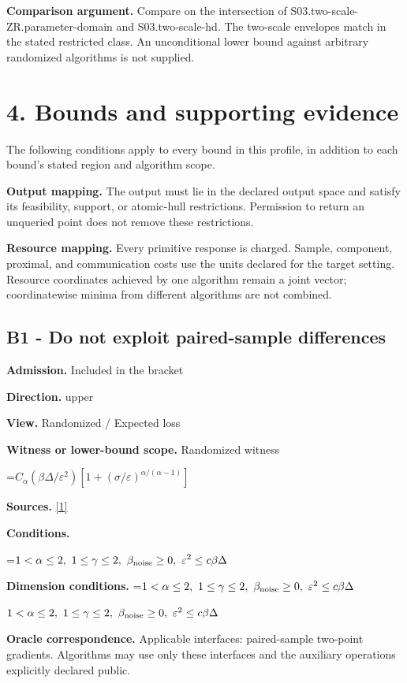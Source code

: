 \documentclass[10pt,a4paper]{article}
\newcommand{\AtlasMath}[1]{\par\begingroup\centering\setbox0=\hbox{$\displaystyle #1$}\ifdim\wd0>1.4\linewidth\typeout{ATLAS WIDE FORMULA: \the\wd0}\fi\ifdim\wd0>\linewidth\resizebox{\linewidth}{!}{\box0}\else\box0\fi\par\endgroup}
\newcommand{\AtlasInlineMath}[1]{\begingroup\setbox0=\hbox{$#1$}\ifdim\wd0>.4\linewidth\endgroup\AtlasMath{#1}\else\endgroup$#1$\fi}
\begin{document}
\textbf{Comparison argument.} Compare on the intersection of S03.two-scale-ZR.parameter-domain and S03.two-scale-hd. The two-scale envelopes match in the stated restricted class. An unconditional lower bound against arbitrary randomized algorithms is not supplied.

\section{4. Bounds and supporting evidence}
The following conditions apply to every bound in this profile, in addition to each bound's stated region and algorithm scope.

\textbf{Output mapping.} The output must lie in the declared output space and satisfy its feasibility, support, or atomic-hull restrictions. Permission to return an unqueried point does not remove these restrictions.

\textbf{Resource mapping.} Every primitive response is charged. Sample, component, proximal, and communication costs use the units declared for the target setting. Resource coordinates achieved by one algorithm remain a joint vector; coordinatewise minima from different algorithms are not combined.

\subsection{B1 - Do not exploit paired-sample differences}
\textbf{Admission.} Included in the bracket

\textbf{Direction.} upper

\textbf{View.} Randomized / Expected loss

\textbf{Witness or lower-bound scope.} Randomized witness

\AtlasMath{C_\alpha (\beta\Delta/\varepsilon^2)[1+(\sigma/\varepsilon)^{\alpha/(\alpha-1)}]}
\textbf{Sources.} \href{https://arxiv.org/pdf/2512.18713}{[1]}

\textbf{Conditions.} 
\AtlasMath{1<\alpha\le2,\ 1\le\gamma\le2,\ \beta_{\rm noise}\ge0,\ \varepsilon^2\le c\beta\Delta}


\textbf{Dimension conditions.} \AtlasInlineMath{1<\alpha\le2,\ 1\le\gamma\le2,\ \beta_{\rm noise}\ge0,\ \varepsilon^2\le c\beta\Delta}

\textbf{Oracle correspondence.} Applicable interfaces: paired-sample two-point gradients. Algorithms may use only these interfaces and the auxiliary operations explicitly declared public.
\end{document}
